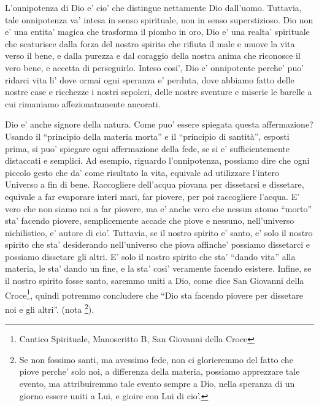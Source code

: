 L'onnipotenza di Dio e' cio' che distingue nettamente Dio dall'uomo. Tuttavia, tale onnipotenza va' intesa in senso spirituale, non in senso superstizioso. Dio non e' una entita' magica che trasforma il piombo in oro, Dio e' una realta' spirituale che scaturisce dalla forza del nostro spirito che rifiuta il male e muove la vita verso il bene, e dalla purezza e dal coraggio della nostra anima che riconosce il vero bene, e accetta di perseguirlo. Inteso cosi', Dio e' onnipotente perche' puo' ridarci vita li' dove ormai ogni speranza e' perduta, dove abbiamo fatto delle nostre case e ricchezze i nostri sepolcri, delle nostre sventure e miserie le barelle a cui rimaniamo affezionatamente ancorati.

Dio e' anche signore della natura. Come puo' essere spiegata questa affermazione? Usando il ``principio della materia morta'' e il ``principio di santità'', esposti prima, si puo' spiegare ogni affermazione della fede, se si e' sufficientemente distaccati e semplici. Ad esempio, riguardo l'onnipotenza, possiamo dire che ogni piccolo gesto che da' come risultato la vita, equivale ad utilizzare l'intero Universo a fin di bene. Raccogliere dell'acqua piovana per dissetarsi e dissetare, equivale a far evaporare interi mari, far piovere, per poi raccogliere l'acqua. E' vero che non siamo noi a far piovere, ma e' anche vero che nessun atomo ``morto'' sta' facendo piovere, semplicemente accade che piove e nessuno, nell'universo nichilistico, e' autore di cio'. Tuttavia, se il nostro spirito e' santo, e' solo il nostro spirito che sta' desiderando nell'universo che  piova affinche' possiamo dissetarci e possiamo dissetare gli altri. E' solo il nostro spirito che sta' ``dando vita'' alla materia, le sta' dando un fine, e la sta' cosi' veramente facendo esistere. Infine, se il nostro spirito fosse santo, saremmo uniti a Dio, come dice San Giovanni della Croce\footnote{Cantico Spirituale, Manoscritto B, San Giovanni della Croce}, quindi potremmo concludere che ``Dio sta facendo piovere per dissetare noi e gli altri''. (nota \footnote{Se non fossimo santi, ma avessimo fede, non ci glorieremmo del fatto che piove perche' solo noi, a differenza della materia, possiamo apprezzare tale evento, ma attribuiremmo tale evento sempre a Dio, nella speranza di un giorno essere uniti a Lui, e gioire con Lui di cio'.}).

